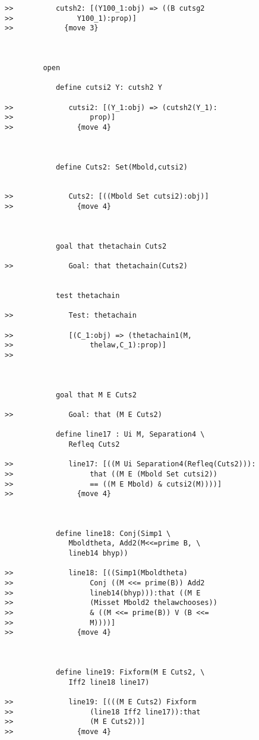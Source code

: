 \documentclass[12pt]{article}
\begin{document}
\begin{verbatim}
>>          cutsh2: [(Y100_1:obj) => ((B cutsg2
>>               Y100_1):prop)]
>>            {move 3}



         open

            define cutsi2 Y: cutsh2 Y

>>             cutsi2: [(Y_1:obj) => (cutsh2(Y_1):
>>                  prop)]
>>               {move 4}



            define Cuts2: Set(Mbold,cutsi2)


>>             Cuts2: [((Mbold Set cutsi2):obj)]
>>               {move 4}



            goal that thetachain Cuts2

>>             Goal: that thetachain(Cuts2)


            test thetachain

>>             Test: thetachain

>>             [(C_1:obj) => (thetachain1(M,
>>                  thelaw,C_1):prop)]
>>               



            goal that M E Cuts2

>>             Goal: that (M E Cuts2)

            define line17 : Ui M, Separation4 \
               Refleq Cuts2

>>             line17: [((M Ui Separation4(Refleq(Cuts2))):
>>                  that ((M E (Mbold Set cutsi2))
>>                  == ((M E Mbold) & cutsi2(M))))]
>>               {move 4}



            define line18: Conj(Simp1 \
               Mboldtheta, Add2(M<<=prime B, \
               lineb14 bhyp))

>>             line18: [((Simp1(Mboldtheta)
>>                  Conj ((M <<= prime(B)) Add2
>>                  lineb14(bhyp))):that ((M E
>>                  (Misset Mbold2 thelawchooses))
>>                  & ((M <<= prime(B)) V (B <<=
>>                  M))))]
>>               {move 4}



            define line19: Fixform(M E Cuts2, \
               Iff2 line18 line17)

>>             line19: [(((M E Cuts2) Fixform
>>                  (line18 Iff2 line17)):that
>>                  (M E Cuts2))]
>>               {move 4}




\end{verbatim}
\end{document}

